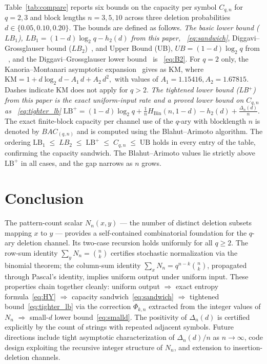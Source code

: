 \documentclass[conference]{IEEEtran}
\begin{document}
Table~\ref{tab:compare} reports six bounds on the capacity per symbol
$C_{q,n}$ for $q=2,3$ and block lengths $n=3,5,10$ across three
deletion probabilities $d\in\{0.05,0.10,0.20\}$. The bounds are defined as follows.
\emph{ The basic lower bound (\(LB_1\)), $LB_1=(1-d)\log_2 q-h_2(d)$ from this paper, ~\eqref{eq:sandwich}}, Diggavi--Grossglauser bound ($LB_2$)~\cite{diggavi2001}, and Upper Bound (UB), $UB=(1-d)\log_2 q$ from ~\cite{mitzenmacher2009},
and the Diggavi--Grossglauser lower bound~\cite{diggavi2001} is ~\eqref{eq:B2}.
For $q=2$ only, the Kanoria--Montanari asymptotic expansion~\cite{kanoria2013} gives as KM, where
\(
  \mathrm{KM} = 1 + d\log_2 d - A_1\,d + A_2\,d^2,
\)
with values of $A_1=1.15416,A_2=1.67815$. Dashes indicate KM does not apply for $q>2$.
\emph{The tightened lower bound (LB$^+$) from this paper is the exact uniform-input
rate and a proved lower bound on $C_{q,n}$ as ~\eqref{eq:tighter_lb}}
\(
  \mathrm{LB}^{+} = (1-d)\log_2 q
    + \frac{1}{n}H_{\mathrm{Bin}}(n,1-d)
    - h_2(d)
    + \frac{\Delta_n(d)}{n}.
\)
The exact finite-block capacity per channel use of the $q$-ary with blocklength $n$ is denoted by $BAC_{(q,n)}$ and is computed using the
Blahut--Arimoto algorithm.
The ordering
\(
  \mathrm{LB_1} \;\le\; LB_2 \;\le\; \mathrm{LB}^{+} \;\le\; C_{q,n} \;\le\; \mathrm{UB}
\)
holds in every entry of the table, confirming the capacity sandwich.
The Blahut--Arimoto values lie strictly above $\mathrm{LB}^{+}$ in all
cases, and the gap narrows as $n$ grows.
 



\section{Conclusion}
\label{sec:conclusion}

The pattern-count scalar $N_n(x,y)$ — the number of distinct deletion
subsets mapping $x$ to $y$ — provides a self-contained combinatorial
foundation for the $q$-ary deletion channel.  Its two-case recursion
holds uniformly for all $q\ge 2$.  The row-sum identity
$\sum_y N_n=\binom{n}{k}$ certifies stochastic normalization via the
binomial theorem; the column-sum identity $\sum_x N_n=q^{n-k}\binom{n}{k}$,
propagated through Pascal's identity, implies uniform output under
uniform input.
These properties chain together cleanly: uniform output
$\Rightarrow$ exact entropy formula~\eqref{eq:HY}
$\Rightarrow$ capacity sandwich~\eqref{eq:sandwich}
$\Rightarrow$ tightened bound~\eqref{eq:tighter_lb} via the correction
$\Phi_{k,n}$ extracted from the integer values of $N_n$
$\Rightarrow$ small-$d$ lower bound~\eqref{eq:smalld}.
The positivity of $\Delta_n(d)$ is certified explicitly by the
count of strings with repeated adjacent symbols.
Future directions include tight asymptotic characterization of
$\Delta_n(d)/n$ as $n\to\infty$, code design exploiting the recursive
integer structure of $N_n$, and extension to insertion-deletion channels.
\end{document}
